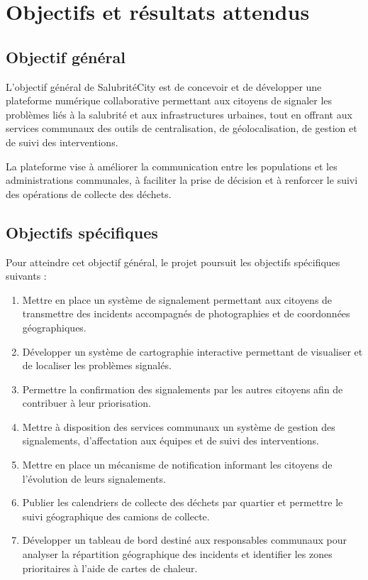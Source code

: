 \documentclass[11pt,a4paper,oneside]{report}
\begin{document}
	\section{Objectifs et résultats attendus}
	
	\subsection{Objectif général}
	
	L'objectif général de SalubritéCity est de concevoir
	et de développer une plateforme numérique
	collaborative permettant aux citoyens de signaler
	les problèmes liés à la salubrité et aux infrastructures
	urbaines, tout en offrant aux services communaux
	des outils de centralisation, de géolocalisation,
	de gestion et de suivi des interventions.
	
	La plateforme vise à améliorer la communication
	entre les populations et les administrations
	communales, à faciliter la prise de décision et à
	renforcer le suivi des opérations de collecte des déchets.
	
	\subsection{Objectifs spécifiques}
	
	Pour atteindre cet objectif général, le projet poursuit
	les objectifs spécifiques suivants :
	
	\begin{enumerate}
		\item Mettre en place un système de signalement
		permettant aux citoyens de transmettre des incidents
		accompagnés de photographies et de coordonnées
		géographiques.
		
		\item Développer un système de cartographie
		interactive permettant de visualiser et de localiser
		les problèmes signalés.
		
		\item Permettre la confirmation des signalements
		par les autres citoyens afin de contribuer à leur
		priorisation.
		
		\item Mettre à disposition des services communaux
		un système de gestion des signalements,
		d'affectation aux équipes et de suivi des interventions.
		
		\item Mettre en place un mécanisme de notification
		informant les citoyens de l'évolution de leurs
		signalements.
		
		\item Publier les calendriers de collecte des déchets
		par quartier et permettre le suivi géographique
		des camions de collecte.
		
		\item Développer un tableau de bord destiné aux
		responsables communaux pour analyser la
		répartition géographique des incidents et identifier
		les zones prioritaires à l'aide de cartes de chaleur.
	\end{enumerate}
	
\end{document}
